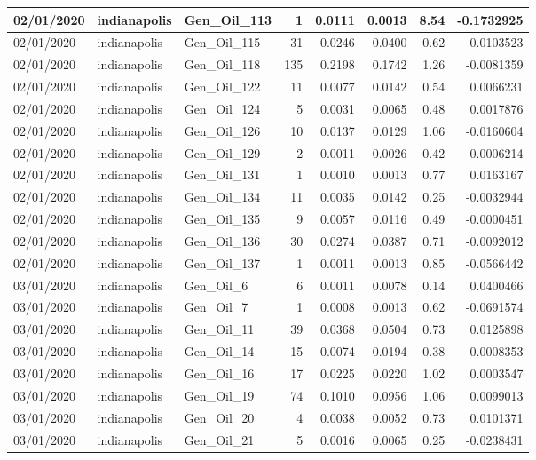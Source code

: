 \documentclass[
  letterpaper,
  DIV=11,
  numbers=noendperiod]{scrartcl}
\begin{document}
\begin{tabular}{l|l|l|r|r|r|r|r}
\hline
02/01/2020 & indianapolis & Gen\_Oil\_113 & 1 & 0.0111 & 0.0013 & 8.54 & -0.1732925\\
\hline
02/01/2020 & indianapolis & Gen\_Oil\_115 & 31 & 0.0246 & 0.0400 & 0.62 & 0.0103523\\
\hline
02/01/2020 & indianapolis & Gen\_Oil\_118 & 135 & 0.2198 & 0.1742 & 1.26 & -0.0081359\\
\hline
02/01/2020 & indianapolis & Gen\_Oil\_122 & 11 & 0.0077 & 0.0142 & 0.54 & 0.0066231\\
\hline
02/01/2020 & indianapolis & Gen\_Oil\_124 & 5 & 0.0031 & 0.0065 & 0.48 & 0.0017876\\
\hline
02/01/2020 & indianapolis & Gen\_Oil\_126 & 10 & 0.0137 & 0.0129 & 1.06 & -0.0160604\\
\hline
02/01/2020 & indianapolis & Gen\_Oil\_129 & 2 & 0.0011 & 0.0026 & 0.42 & 0.0006214\\
\hline
02/01/2020 & indianapolis & Gen\_Oil\_131 & 1 & 0.0010 & 0.0013 & 0.77 & 0.0163167\\
\hline
02/01/2020 & indianapolis & Gen\_Oil\_134 & 11 & 0.0035 & 0.0142 & 0.25 & -0.0032944\\
\hline
02/01/2020 & indianapolis & Gen\_Oil\_135 & 9 & 0.0057 & 0.0116 & 0.49 & -0.0000451\\
\hline
02/01/2020 & indianapolis & Gen\_Oil\_136 & 30 & 0.0274 & 0.0387 & 0.71 & -0.0092012\\
\hline
02/01/2020 & indianapolis & Gen\_Oil\_137 & 1 & 0.0011 & 0.0013 & 0.85 & -0.0566442\\
\hline
03/01/2020 & indianapolis & Gen\_Oil\_6 & 6 & 0.0011 & 0.0078 & 0.14 & 0.0400466\\
\hline
03/01/2020 & indianapolis & Gen\_Oil\_7 & 1 & 0.0008 & 0.0013 & 0.62 & -0.0691574\\
\hline
03/01/2020 & indianapolis & Gen\_Oil\_11 & 39 & 0.0368 & 0.0504 & 0.73 & 0.0125898\\
\hline
03/01/2020 & indianapolis & Gen\_Oil\_14 & 15 & 0.0074 & 0.0194 & 0.38 & -0.0008353\\
\hline
03/01/2020 & indianapolis & Gen\_Oil\_16 & 17 & 0.0225 & 0.0220 & 1.02 & 0.0003547\\
\hline
03/01/2020 & indianapolis & Gen\_Oil\_19 & 74 & 0.1010 & 0.0956 & 1.06 & 0.0099013\\
\hline
03/01/2020 & indianapolis & Gen\_Oil\_20 & 4 & 0.0038 & 0.0052 & 0.73 & 0.0101371\\
\hline
03/01/2020 & indianapolis & Gen\_Oil\_21 & 5 & 0.0016 & 0.0065 & 0.25 & -0.0238431\\

\end{tabular}
\end{document}
